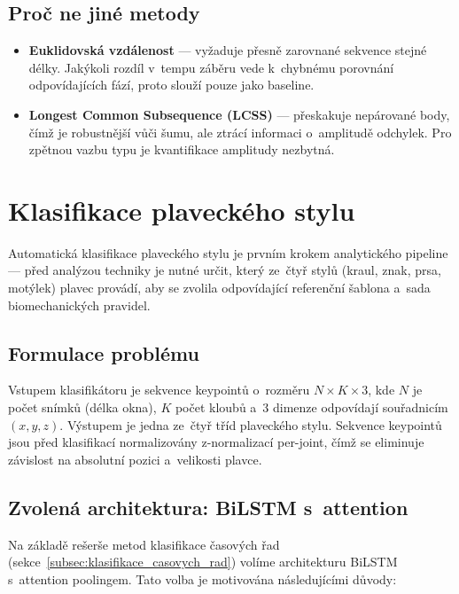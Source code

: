 \subsection{Proč ne jiné metody}

\begin{itemize}
    \item \textbf{Euklidovská vzdálenost} --- vyžaduje přesně zarovnané sekvence stejné délky. Jakýkoli rozdíl v~tempu záběru vede k~chybnému porovnání odpovídajících fází, proto slouží pouze jako baseline.
    \item \textbf{Longest Common Subsequence (LCSS)} --- přeskakuje nepárované body, čímž je robustnější vůči šumu, ale ztrácí informaci o~amplitudě odchylek. Pro zpětnou vazbu typu  je kvantifikace amplitudy nezbytná.
\end{itemize}

\section{Klasifikace plaveckého stylu}
\label{sec:klasifikace_stylu}

Automatická klasifikace plaveckého stylu je prvním krokem analytického pipeline --- před analýzou techniky je nutné určit, který ze~čtyř stylů (kraul, znak, prsa, motýlek) plavec provádí, aby se zvolila odpovídající referenční šablona a~sada biomechanických pravidel.

\subsection{Formulace problému}

Vstupem klasifikátoru je sekvence keypointů o~rozměru $N \times K \times 3$, kde $N$ je počet snímků (délka okna), $K$ počet kloubů a~3 dimenze odpovídají souřadnicím $(x, y, z)$. Výstupem je jedna ze~čtyř tříd plaveckého stylu. Sekvence keypointů jsou před klasifikací normalizovány z-normalizací per-joint, čímž se eliminuje závislost na absolutní pozici a~velikosti plavce.

\subsection{Zvolená architektura: BiLSTM s~attention}
\label{subsec:bilstm_attention}

Na základě rešerše metod klasifikace časových řad (sekce~\ref{subsec:klasifikace_casovych_rad}) volíme architekturu BiLSTM s~attention poolingem. Tato volba je motivována následujícími důvody:

